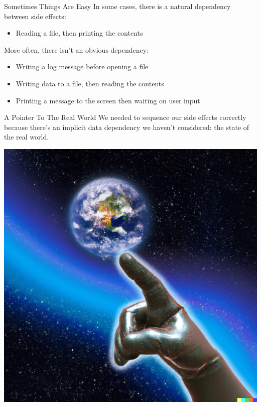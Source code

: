\documentclass[10pt, presentation, colorlinks]{beamer}
\begin{document}
\begin{frame}[label={sec:org41e9319}]{Sometimes Things Are Easy}
In some cases, there is a natural dependency between side effects:

\bigskip
\pause
\begin{itemize}
\item Reading a file, then printing the contents
\end{itemize}

\bigskip
\pause
More often, there isn't an obvious dependency:

\bigskip
\pause
\begin{itemize}
\item Writing a log message before opening a file
\item Writing data to a file, then reading the contents
\item Printing a message to the screen then waiting on user input
\end{itemize}
\end{frame}

\begin{frame}[label={sec:org996b4c1}]{A Pointer To The Real World}
We needed to \alert{sequence} our side effects correctly because there's an implicit data dependency we haven't considered: \alert{the state of the real world}.

\bigskip
\pause
\begin{center}
\includegraphics[height=0.4\textheight]{./img/pointing-to-the-real-world.png}
\end{center}
\end{frame}
\end{document}
